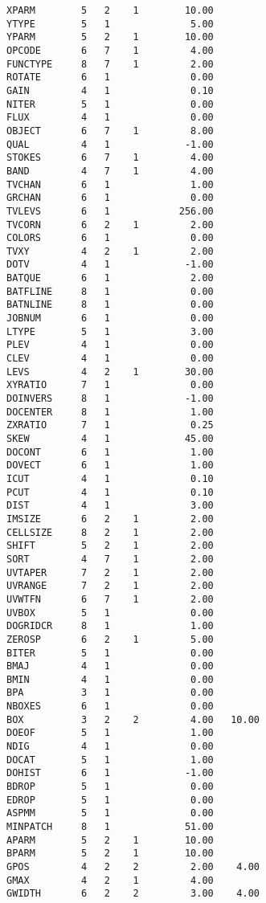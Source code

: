 \begin{verbatim}
XPARM        5   2    1        10.00
YTYPE        5   1              5.00
YPARM        5   2    1        10.00
OPCODE       6   7    1         4.00
FUNCTYPE     8   7    1         2.00
ROTATE       6   1              0.00
GAIN         4   1              0.10
NITER        5   1              0.00
FLUX         4   1              0.00
OBJECT       6   7    1         8.00
QUAL         4   1             -1.00
STOKES       6   7    1         4.00
BAND         4   7    1         4.00
TVCHAN       6   1              1.00
GRCHAN       6   1              0.00
TVLEVS       6   1            256.00
TVCORN       6   2    1         2.00
COLORS       6   1              0.00
TVXY         4   2    1         2.00
DOTV         4   1             -1.00
BATQUE       6   1              2.00
BATFLINE     8   1              0.00
BATNLINE     8   1              0.00
JOBNUM       6   1              0.00
LTYPE        5   1              3.00
PLEV         4   1              0.00
CLEV         4   1              0.00
LEVS         4   2    1        30.00
XYRATIO      7   1              0.00
DOINVERS     8   1             -1.00
DOCENTER     8   1              1.00
ZXRATIO      7   1              0.25
SKEW         4   1             45.00
DOCONT       6   1              1.00
DOVECT       6   1              1.00
ICUT         4   1              0.10
PCUT         4   1              0.10
DIST         4   1              3.00
IMSIZE       6   2    1         2.00
CELLSIZE     8   2    1         2.00
SHIFT        5   2    1         2.00
SORT         4   7    1         2.00
UVTAPER      7   2    1         2.00
UVRANGE      7   2    1         2.00
UVWTFN       6   7    1         2.00
UVBOX        5   1              0.00
DOGRIDCR     8   1              1.00
ZEROSP       6   2    1         5.00
BITER        5   1              0.00
BMAJ         4   1              0.00
BMIN         4   1              0.00
BPA          3   1              0.00
NBOXES       6   1              0.00
BOX          3   2    2         4.00   10.00
DOEOF        5   1              1.00
NDIG         4   1              0.00
DOCAT        5   1              1.00
DOHIST       6   1             -1.00
BDROP        5   1              0.00
EDROP        5   1              0.00
ASPMM        5   1              0.00
MINPATCH     8   1             51.00
APARM        5   2    1        10.00
BPARM        5   2    1        10.00
GPOS         4   2    2         2.00    4.00
GMAX         4   2    1         4.00
GWIDTH       6   2    2         3.00    4.00
\end{verbatim}
